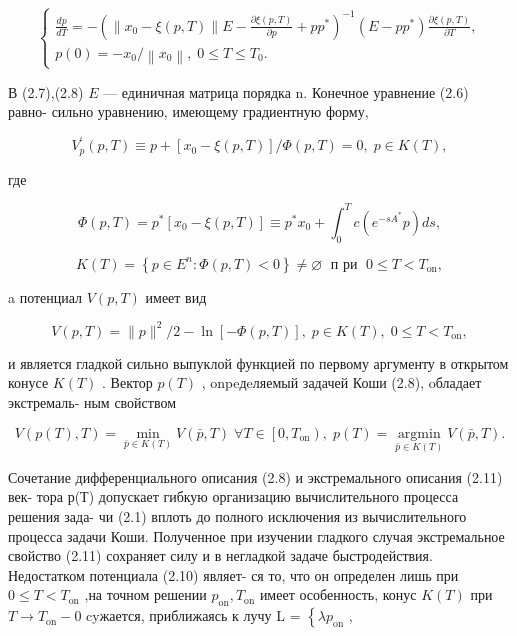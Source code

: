 \documentclass[10pt]{article}
\begin{document}
\[
\left\{  \begin{array}{l} \frac{dp}{dT} =  - {\left( \left\lVert {x}_{0} - \xi \left( p,T\right) \right\rVert E - \frac{\partial \xi \left( {p,T}\right) }{\partial p} + p{p}^{ * }\right) }^{-1}\left( {E - p{p}^{ * }}\right) \frac{\partial \xi \left( {p,T}\right) }{\partial T}, \\  p\left( 0\right)  =  - {x}_{0}/\left\lVert {x}_{0} \right\rVert,\;0 \leq  T \leq  {T}_{0}. \end{array}\right. \tag{2.8}
\]

В (2.7),(2.8) \(E\) — единичная матрица порядка n. Конечное уравнение (2.6) равно- сильно уравнению, имеющему градиентную форму,

\[
{V}_{p}^{\prime }\left( {p,T}\right)  \equiv  p + \left[  {{x}_{0} - \xi \left( {p,T}\right) }\right]  /\Phi \left( {p,T}\right)  = 0,\;p \in  K\left( T\right) , \tag{2.9}
\]

где

\[
\Phi \left( {p,T}\right)  = {p}^{ * }\left[  {{x}_{0} - \xi \left( {p,T}\right) }\right]   \equiv  {p}^{ * }{x}_{0} + {\int }_{0}^{T}c\left( {{e}^{-s{A}^{ * }}p}\right) {ds},
\]

\[
K\left( T\right)  = \left\{  {p \in  {E}^{n} : \Phi \left( {p,T}\right)  < 0}\right\}   \neq  \varnothing \;\text{ п ри }\;0 \leq  T < {T}_{\mathrm{{on}}},
\]

a потенциал \(V\left( {p,T}\right)\) имеет вид

\[
V\left( {p,T}\right)  = \parallel p{\parallel }^{2}/2 - \ln \left[  {-\Phi \left( {p,T}\right) }\right]  ,\;p \in  K\left( T\right) ,\;0 \leq  T < {T}_{\mathrm{{on}}}, \tag{2.10}
\]

и является гладкой сильно выпуклой функцией по первому аргументу в открытом конусе \(K\left( T\right)\) . Вектор \(p\left( T\right)\) , onpeдeляемый задачей Коши (2.8), oбладает экстремаль- ным свойством

\[
V\left( {p\left( T\right) ,T}\right)  = \mathop{\min }\limits_{{\bar{p} \in  K\left( T\right) }}V\left( {\bar{p},T}\right) \;\forall T \in  \left[  {0,{T}_{\mathrm{{on}}}}\right) ,\;p\left( T\right)  = \mathop{\operatorname{argmin}}\limits_{{\bar{p} \in  K\left( T\right) }}V\left( {\bar{p},T}\right) . \tag{2.11}
\]

Сочетание дифференциального описания (2.8) и экстремального описания (2.11) век- тора р(Т) допускает гибкую организацию вычислительного процесса решения зада- чи (2.1) вплоть до полного исключения из вычислительного процесса задачи Коши. Полученное при изучении гладкого случая экстремальное свойство (2.11) сохраняет силу и в негладкой задаче быстродействия. Недостатком потенциала (2.10) являет- ся то, что он определен лишь при \(0 \leq  T < {T}_{\mathrm{{on}}}\) ,на точном решении \({p}_{\mathrm{{on}}},{T}_{\mathrm{{on}}}\) имеет особенность, конус \(K\left( T\right)\) при \(T \rightarrow  {T}_{\mathrm{{on}}} - 0\) cyжается, приближаясь к лучу L = \(\left\{  {\lambda {p}_{\mathrm{{on}}}}\right.\) ,
\end{document}
